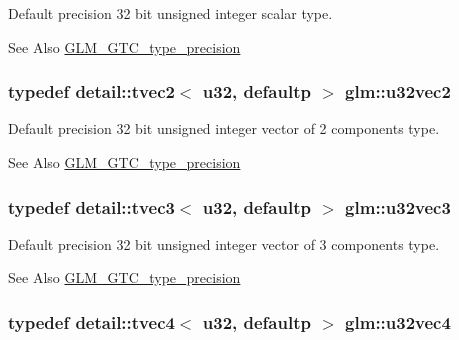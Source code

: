 Default precision 32 bit unsigned integer scalar type. \begin{DoxySeeAlso}{See Also}
\hyperlink{group__gtc__type__precision}{G\-L\-M\-\_\-\-G\-T\-C\-\_\-type\-\_\-precision} 
\end{DoxySeeAlso}
\hypertarget{group__gtc__type__precision_gaa543e17450ca67dee12e2c41badfb3a7}{
\subsubsection[{u32vec2}]{\setlength{\rightskip}{0pt plus 5cm}typedef detail\-::tvec2$<$ u32, defaultp $>$ {\bf glm\-::u32vec2}}}\label{group__gtc__type__precision_gaa543e17450ca67dee12e2c41badfb3a7}
Default precision 32 bit unsigned integer vector of 2 components type. \begin{DoxySeeAlso}{See Also}
\hyperlink{group__gtc__type__precision}{G\-L\-M\-\_\-\-G\-T\-C\-\_\-type\-\_\-precision} 
\end{DoxySeeAlso}
\hypertarget{group__gtc__type__precision_ga7c88634a005904a441cba739d7cc4055}{
\subsubsection[{u32vec3}]{\setlength{\rightskip}{0pt plus 5cm}typedef detail\-::tvec3$<$ u32, defaultp $>$ {\bf glm\-::u32vec3}}}\label{group__gtc__type__precision_ga7c88634a005904a441cba739d7cc4055}
Default precision 32 bit unsigned integer vector of 3 components type. \begin{DoxySeeAlso}{See Also}
\hyperlink{group__gtc__type__precision}{G\-L\-M\-\_\-\-G\-T\-C\-\_\-type\-\_\-precision} 
\end{DoxySeeAlso}
\hypertarget{group__gtc__type__precision_ga7e4574f8327a2f576baf2617343d0170}{
\subsubsection[{u32vec4}]{\setlength{\rightskip}{0pt plus 5cm}typedef detail\-::tvec4$<$ u32, defaultp $>$ {\bf glm\-::u32vec4}}}\label{group__gtc__type__precision_ga7e4574f8327a2f576baf2617343d0170}

